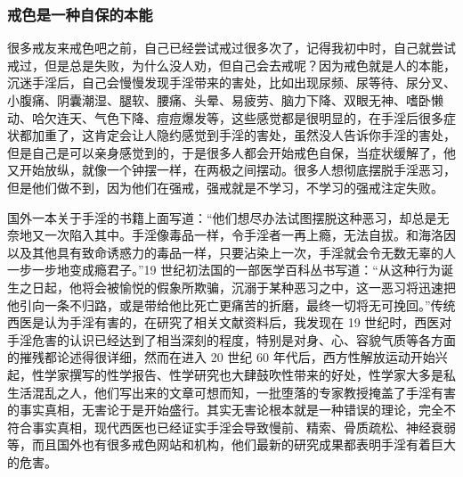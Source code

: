 \subsubsection{戒色是一种自保的本能}

很多戒友来戒色吧之前，自己已经尝试戒过很多次了，记得我初中时，自己就尝试戒过，但是总是失败，为什么没人劝，但自己会去戒呢？因为戒色就是人的本能，沉迷手淫后，自己会慢慢发现手淫带来的害处，比如出现尿频、尿等待、尿分叉、小腹痛、阴囊潮湿、腿软、腰痛、头晕、易疲劳、脑力下降、双眼无神、嗜卧懒动、哈欠连天、气色下降、痘痘爆发等，这些感觉都是很明显的，在手淫后很多症状都加重了，这肯定会让人隐约感觉到手淫的害处，虽然没人告诉你手淫的害处，但是自己是可以亲身感觉到的，于是很多人都会开始戒色自保，当症状缓解了，他又开始放纵，就像一个钟摆一样，在两极之间摆动。很多人想彻底摆脱手淫恶习，但是他们做不到，因为他们在强戒，强戒就是不学习，不学习的强戒注定失败。

国外一本关于手淫的书籍上面写道：“他们想尽办法试图摆脱这种恶习，却总是无奈地又一次陷入其中。手淫像毒品一样，令手淫者一再上瘾，无法自拔。和海洛因以及其他具有致命诱惑力的毒品一样，只要沾染上一次，手淫就会令无数无辜的人一步一步地变成瘾君子。”19 世纪初法国的一部医学百科丛书写道：“从这种行为诞生之日起，他将会被愉悦的假象所欺骗，沉溺于某种恶习之中，这一恶习将迅速把他引向一条不归路，或是带给他比死亡更痛苦的折磨，最终一切将无可挽回。”传统西医是认为手淫有害的，在研究了相关文献资料后，我发现在 19 世纪时，西医对手淫危害的认识已经达到了相当深刻的程度，特别是对身、心、容貌气质等各方面的摧残都论述得很详细，然而在进入 20 世纪 60 年代后，西方性解放运动开始兴起，性学家撰写的性学报告、性学研究也大肆鼓吹性带来的好处，性学家大多是私生活混乱之人，他们写出来的文章可想而知，一批堕落的专家教授掩盖了手淫有害的事实真相，无害论于是开始盛行。其实无害论根本就是一种错误的理论，完全不符合事实真相，现代西医也已经证实手淫会导致慢前、精索、骨质疏松、神经衰弱等，而且国外也有很多戒色网站和机构，他们最新的研究成果都表明手淫有着巨大的危害。

